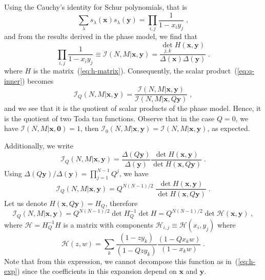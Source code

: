\documentclass[a4paper,11pt]{amsart}
\begin{document}
Using the Cauchy's identity for Schur polynomials, that is 
\begin{equation}
  \sum_\lambda s_\lambda(\bm{x}) s_\lambda(\bm{y}) = \prod_{i,j} \frac{1}{1 - x_i y_j}\; ,
\end{equation}
and from the results derived in the phase model, we find that
\begin{equation}
  \prod_{i,j}\frac{1}{1 - x_i y_j}  \equiv \mathcal{I}(N,M|\bm{x}, \bm{y}) = 
  \frac{\det_{j,k}H(\bm{x},\bm{y})}{\Delta(\bm{x}) \Delta(\bm{y})}\; .
\end{equation}
where \(H\) is the matrix~(\ref{eq:h-matrix}). Consequently, the scalar
product~(\ref{eq:q-inner}) becomes
\begin{equation}
  \mathcal{I}_Q(N,M | \bm{x}, \bm{y})  
= \frac{\mathcal{I}(N,M|\bm{x}, \bm{y})}{\mathcal{I}(N,M|\bm{x}, Q\bm{y})}\; , 
\end{equation}
and we see that it is the quotient of scalar products of the phase
model. Hence, it is the quotient of two Toda tau functions.
Observe that in the case \(Q = 0\), we have \(\mathcal{I}(N, M|
\bm{x}, \bm{0}) = 1\), then \(\mathcal{I}_0(N,M | \bm{x}, \bm{y})
= \mathcal{I}(N,M | \bm{x}, \bm{y})\), as expected.

Additionally, we write
\begin{equation}
  \mathcal{I}_Q(N,M | \bm{x}, \bm{y})  
  = \frac{\Delta(Q\bm{y})}{\Delta(\bm{y})}
  \frac{\det H(\bm{x}, \bm{y})}{\det H(\bm{x},Q \bm{y})} \; .
\end{equation}
Using \(\Delta(Q\bm{y})/ \Delta(\bm{y}) = \prod_{j=1}^{N-1} Q^j\), we have 
\begin{equation}
  \mathcal{I}_Q(N,M | \bm{x}, \bm{y}) =  Q^{N(N-1)/2}\;
  \frac{\det H(\bm{x}, \bm{y})}{\det H(\bm{x}, Q \bm{y})} \; .
\end{equation}
Let us denote \(H(\bm{x}, Q\bm{y}) = H_{Q}\), therefore
\begin{equation}
  \mathcal{I}_Q(N,M | \bm{x}, \bm{y}) = Q^{N(N-1)/2} \det H_{Q}^{-1} \det H
= Q^{N(N-1)/2} \det \mathcal{H}(\bm{x}, \bm{y}) \; ,
\end{equation}
where \(\mathcal{H} = H_{Q}^{-1} H\) is a matrix with components 
\(\mathcal{H}_{i,j} \equiv \mathcal{H}(x_i, y_j)\) where
\begin{equation}
  \mathcal{H}(z, w) = \sum_{k} \frac{(1 - z y_k)}{(1 - Q z y_k)} 
\frac{(1 - Q x_k w)}{(1 - x_k w)}\; .
\end{equation}
Note that from this expression, we cannot decompose this function as
in~(\ref{eq:h-exp}) since the coefficients in this expansion depend on
\(\bm{x}\) and \(\bm{y}\).
\end{document}
